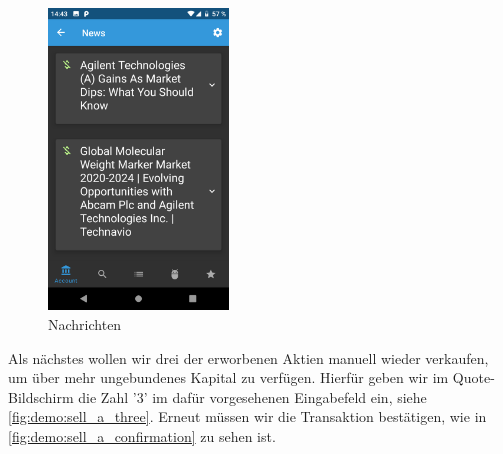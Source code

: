 \documentclass[a4paper]{article}
\begin{document}
\begin{figure}[H]
	\centering
	\includegraphics[height=8cm,keepaspectratio]{./images/demo/news.png}
	\caption{Nachrichten}
	\label{fig:demo:news}
\end{figure}

Als nächstes wollen wir drei der erworbenen Aktien manuell wieder verkaufen, um über mehr ungebundenes Kapital zu verfügen. Hierfür geben wir im Quote-Bildschirm die Zahl '3' im dafür vorgesehenen Eingabefeld ein, siehe \autoref{fig:demo:sell_a_three}. Erneut müssen wir die Transaktion bestätigen, wie in \autoref{fig:demo:sell_a_confirmation} zu sehen ist.
\end{document}
